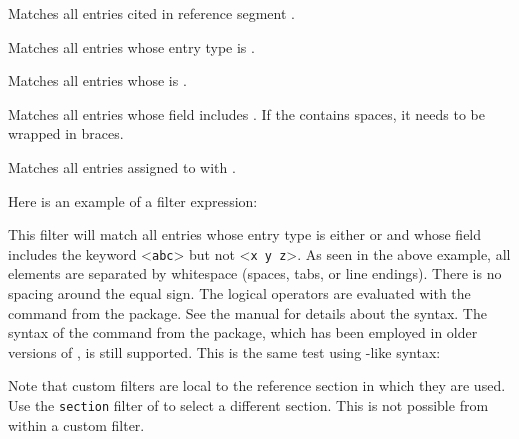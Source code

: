 \documentclass{ltxdockit}[2011/03/25]
\newcommand*{\biblatex}{\sty{biblatex}\xspace}
\begin{document}
\begin{optionlist*}


Matches all entries cited in reference segment .


Matches all entries whose entry type is .


Matches all entries whose  is .


Matches all entries whose  field includes . If the  contains spaces, it needs to be wrapped in braces.


Matches all entries assigned to  with .

\end{optionlist*}

Here is an example of a filter expression:

\begin{ltxexample}[style=latex,keywords={and,or,not,type,keyword}]
\end{ltxexample}
%
This filter will match all entries whose entry type is either  or  and whose  field includes the keyword <\texttt{abc}> but not <\texttt{x y z}>. As seen in the above example, all elements are separated by whitespace (spaces, tabs, or line endings). There is no spacing around the equal sign. The logical operators are evaluated with the  command from the  package. See the  manual for details about the syntax. The syntax of the  command from the  package, which has been employed in older versions of \biblatex, is still supported. This is the same test using -like syntax:

\begin{ltxexample}[style=ifthen,morekeywords={\\type,\\keyword}]
\end{ltxexample}
%
Note that custom filters are local to the reference section in which they are used. Use the \texttt{section} filter of  to select a different section. This is not possible from within a custom filter.
\end{document}
